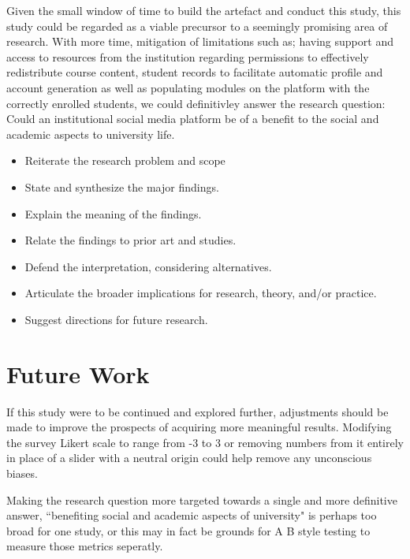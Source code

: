 \documentclass[lettersize,journal]{IEEEtran}
\begin{document}
Given the small window of time to build the artefact and conduct this study, this study could be regarded as a viable precursor to a seemingly promising area of research. With more time, mitigation of 
limitations such as; having support and access to resources from the institution regarding permissions to effectively redistribute course content, student records to facilitate automatic profile and
account generation as well as populating modules on the platform with the correctly enrolled students, we could definitivley answer the research question: Could an institutional social media platform be of a benefit
to the social and academic aspects to university life.


\begin{itemize}
        \item Reiterate the research problem and scope
        \item State and synthesize the major findings.
        \item Explain the meaning of the findings.
        \item Relate the findings to prior art and studies.
        \item Defend the interpretation, considering alternatives.
        \item Articulate the broader implications for research, theory, and/or practice.
        \item Suggest directions for future research.
\end{itemize}






\section{Future Work}
	If this study were to be continued and explored further, adjustments should be made to improve the prospects of acquiring more meaningful results. Modifying the survey Likert scale to range 
	from -3 to 3 or removing numbers from it entirely in place of a slider with a neutral origin could help remove any unconscious biases.

	Making the research question more targeted towards a single and more definitive answer, ``benefiting social and academic aspects of university" is perhaps too broad for one study,
	or this may in fact be grounds for A B style testing to measure	those metrics seperatly.
\end{document}
